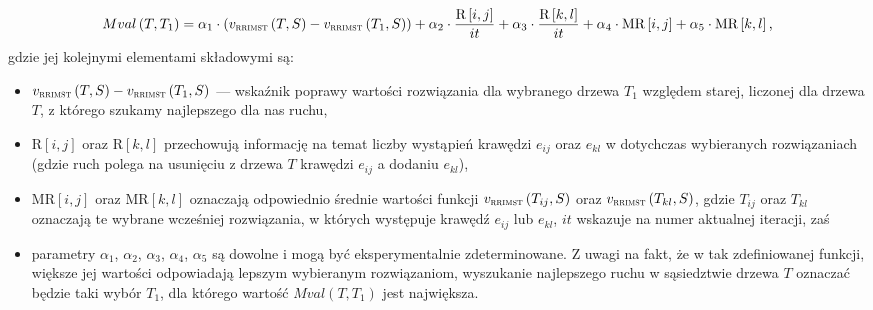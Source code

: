 \begin{equation}\label{eq:moveValue}
	Mval \left( T, T_{1} \right) = \alpha_{1} \cdot \left( v_{\textsc{rrimst}} \left( T, S \right) - v_{\textsc{rrimst}} \left( T_{1}, S \right) \right) + \alpha_{2} \cdot \frac{\text{R} \left[ i, j \right]}{it} + \alpha_{3} \cdot \frac{\text{R} \left[ k, l \right]}{it} + \alpha_{4} \cdot \text{MR} \left[ i, j \right] + \alpha_{5} \cdot \text{MR} \left[ k, l \right]\text{,}
\end{equation}
gdzie jej kolejnymi elementami składowymi są:
\begin{itemize}
	\item $v_{\textsc{rrimst}} \left( T, S \right) - v_{\textsc{rrimst}} \left( T_{1}, S \right)$ --- wskaźnik poprawy wartości rozwiązania dla wybranego drzewa $T_{1}$ względem starej, liczonej dla drzewa $T$, z którego szukamy najlepszego dla nas ruchu,
	\item $\text{R} \left[ i, j \right]$ oraz $\text{R} \left[ k, l \right]$ przechowują informację na temat liczby wystąpień krawędzi $e_{ij}$ oraz $e_{kl}$ w dotychczas wybieranych rozwiązaniach (gdzie ruch polega na usunięciu z drzewa $T$ krawędzi $e_{ij}$ a dodaniu $e_{kl}$),
	\item $\text{MR} \left[ i, j \right]$ oraz $\text{MR} \left[ k, l \right]$ oznaczają odpowiednio średnie wartości funkcji $v_{\textsc{rrimst}} \left( T_{ij}, S \right)$ oraz $v_{\textsc{rrimst}} \left( T_{kl}, S \right)$, gdzie $T_{ij}$ oraz $T_{kl}$ oznaczają te wybrane wcześniej rozwiązania, w których występuje krawędź $e_{ij}$ lub $e_{kl}$, $it$ wskazuje na numer aktualnej iteracji, zaś
	\item parametry $\alpha_{1}$, $\alpha_{2}$, $\alpha_{3}$, $\alpha_{4}$, $\alpha_{5}$ są dowolne i mogą być eksperymentalnie zdeterminowane. Z uwagi na fakt, że w tak zdefiniowanej funkcji, większe jej wartości odpowiadają lepszym wybieranym rozwiązaniom, wyszukanie najlepszego ruchu w sąsiedztwie drzewa $T$ oznaczać będzie taki wybór $T_{1}$, dla którego wartość $Mval  \left( T, T_{1} \right)$ jest największa.
\end{itemize}

